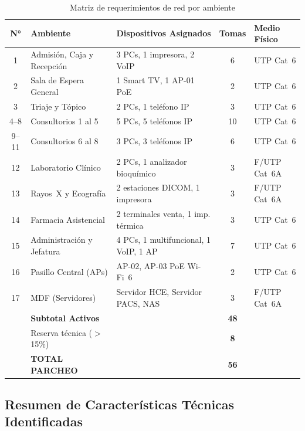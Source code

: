 \begin{table}[H]
\centering
\caption{Matriz de requerimientos de red por ambiente}
\small
\begin{tabularx}{\textwidth}{@{} c >{\raggedright\arraybackslash}p{4.2cm} X c >{\centering\arraybackslash}p{2.4cm} @{}}
\toprule
\textbf{N°} & \textbf{Ambiente} & \textbf{Dispositivos Asignados} & \textbf{Tomas} & \textbf{Medio Físico} \\
\midrule
1  & Admisión, Caja y Recepción & 3 PCs, 1 impresora, 2 VoIP & 6 & UTP Cat~6 \\
2  & Sala de Espera General    & 1 Smart TV, 1 AP-01 PoE & 2 & UTP Cat~6 \\
3  & Triaje y Tópico           & 2 PCs, 1 teléfono IP & 3 & UTP Cat~6 \\
4--8 & Consultorios 1 al 5     & 5 PCs, 5 teléfonos IP & 10 & UTP Cat~6 \\
9--11 & Consultorios 6 al 8   & 3 PCs, 3 teléfonos IP & 6 & UTP Cat~6 \\
12 & Laboratorio Clínico       & 2 PCs, 1 analizador bioquímico & 3 & F/UTP Cat~6A \\
13 & Rayos~X y Ecografía       & 2 estaciones DICOM, 1 impresora & 3 & F/UTP Cat~6A \\
14 & Farmacia Asistencial      & 2 terminales venta, 1 imp. térmica & 3 & UTP Cat~6 \\
15 & Administración y Jefatura & 4 PCs, 1 multifuncional, 1 VoIP, 1 AP & 7 & UTP Cat~6 \\
16 & Pasillo Central (APs)     & AP-02, AP-03 PoE Wi-Fi~6 & 2 & UTP Cat~6 \\
17 & MDF (Servidores)          & Servidor HCE, Servidor PACS, NAS & 3 & F/UTP Cat~6A \\
\midrule
   & \textbf{Subtotal Activos}  &  & \textbf{48} & \\
   & Reserva técnica ($>$15\%) &  & \textbf{8}  & \\
\midrule
   & \textbf{TOTAL PARCHEO}     &  & \textbf{56} & \\
\bottomrule
\end{tabularx}
\label{tab:requerimientos-red}
\end{table}

\subsection{Resumen de Características Técnicas Identificadas}

